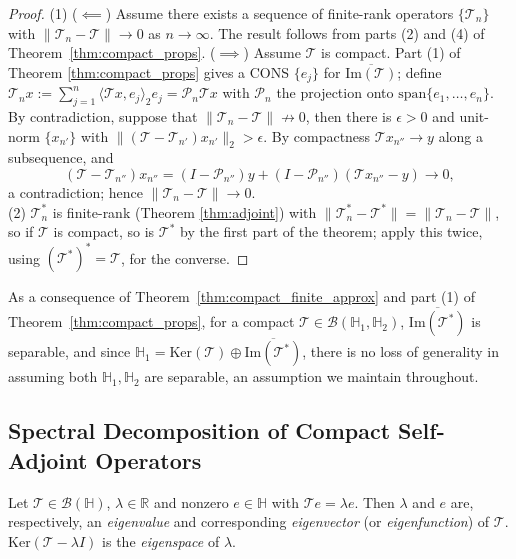 \begin{proof}
(1) ($\impliedby$) Assume there exists a sequence of finite-rank operators $\{\mathcal{T}_n\}$ with $\|\mathcal{T}_n-\mathcal{T}\|\to 0$ as $n\to\infty$. The result follows from parts (2) and (4) of Theorem~\ref{thm:compact_props}. 
($\implies$) Assume $\mathcal{T}$ is compact. Part (1) of Theorem
\ref{thm:compact_props} gives a CONS $\{e_j\}$ for
$\overline{\mathrm{Im}(\mathcal{T})}$; define $\mathcal{T}_nx :=
\sum_{j=1}^n\langle\mathcal{T}x,e_j\rangle_2 e_j = \mathcal{P}_n\mathcal{T}x$
with $\mathcal{P}_n$ the projection onto $\mathrm{span}\{e_1,\dots,e_n\}$.
By contradiction, suppose that $\|\mathcal{T}_n-\mathcal{T}\|\not\to 0$, then there is $\epsilon>0$ and
unit-norm $\{x_{n'}\}$ with $\|(\mathcal{T}-\mathcal{T}_{n'})x_{n'}\|_2
>\epsilon$. By compactness $\mathcal{T}x_{n''}\to y$ along a subsequence, and
\[
(\mathcal{T}-\mathcal{T}_{n''})x_{n''} = (I-\mathcal{P}_{n''})y +
(I-\mathcal{P}_{n''})(\mathcal{T}x_{n''}-y) \to 0,
\]
a contradiction; hence $\|\mathcal{T}_n-\mathcal{T}\|\to 0$.\\

(2) $\mathcal{T}_n^*$ is finite-rank (Theorem
\ref{thm:adjoint}) with $\|\mathcal{T}_n^*-\mathcal{T}^*\| =
\|\mathcal{T}_n-\mathcal{T}\|$, so if $\mathcal{T}$ is compact, so is
$\mathcal{T}^*$ by the first part of the theorem; apply this twice, using
$(\mathcal{T}^*)^*=\mathcal{T}$, for the converse.
\end{proof}

As a consequence of Theorem~\ref{thm:compact_finite_approx} and part (1) of
Theorem~\ref{thm:compact_props}, for a compact
$\mathcal{T}\in\mathcal{B}(\mathbb{H}_1,\mathbb{H}_2)$,
$\overline{\mathrm{Im}(\mathcal{T}^*)}$ is separable, and since $\mathbb{H}_1 =
\mathrm{Ker}(\mathcal{T})\oplus\overline{\mathrm{Im}(\mathcal{T}^*)}$, there is no loss of generality in
assuming both $\mathbb{H}_1,\mathbb{H}_2$ are separable, an assumption we
maintain throughout.

\subsection{Spectral Decomposition of Compact Self-Adjoint Operators}
\label{subsec:spectral_decomp}

\begin{definition}
\label{def:eigen}
Let $\mathcal{T}\in\mathcal{B}(\mathbb{H})$, $\lambda\in\mathbb{R}$
and nonzero $e\in\mathbb{H}$ with $\mathcal{T}e=\lambda e$. Then $\lambda$ and $e$ are, respectively,
an \emph{eigenvalue} and corresponding \emph{eigenvector} (or
\emph{eigenfunction}) of
$\mathcal{T}$. $\mathrm{Ker}(\mathcal{T}-\lambda I)$ is the
\emph{eigenspace} of $\lambda$.
\end{definition}

